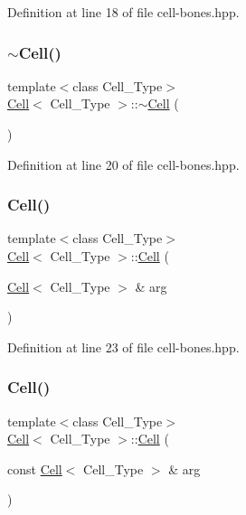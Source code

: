 Definition at line 18 of file cell-\/bones.\+hpp.

\mbox{\label{class_cell_a12667d768c7eab9e295b3476a5d60c0e}} 
\subsubsection{\texorpdfstring{$\sim$\+Cell()}{~Cell()}}
{\footnotesize\ttfamily template$<$class Cell\+\_\+\+Type$>$ \\
\hyperlink{class_cell}{Cell}$<$ Cell\+\_\+\+Type $>$\+::$\sim$\hyperlink{class_cell}{Cell} (\begin{DoxyParamCaption}{ }\end{DoxyParamCaption})\hspace{0.3cm}{\ttfamily [inline]}}



Definition at line 20 of file cell-\/bones.\+hpp.

\mbox{\label{class_cell_ac116d4235eadb134018324455a9bbdbf}} 
\subsubsection{\texorpdfstring{Cell()}{Cell()}\hspace{0.1cm}{\footnotesize\ttfamily [3/9]}}
{\footnotesize\ttfamily template$<$class Cell\+\_\+\+Type$>$ \\
\hyperlink{class_cell}{Cell}$<$ Cell\+\_\+\+Type $>$\+::\hyperlink{class_cell}{Cell} (\begin{DoxyParamCaption}\item[{\hyperlink{class_cell}{Cell}$<$ Cell\+\_\+\+Type $>$ \&}]{arg }\end{DoxyParamCaption})\hspace{0.3cm}{\ttfamily [inline]}}



Definition at line 23 of file cell-\/bones.\+hpp.

\mbox{\label{class_cell_ab745c6f11e7f43f06318b4bb733d9474}} 
\subsubsection{\texorpdfstring{Cell()}{Cell()}\hspace{0.1cm}{\footnotesize\ttfamily [4/9]}}
{\footnotesize\ttfamily template$<$class Cell\+\_\+\+Type$>$ \\
\hyperlink{class_cell}{Cell}$<$ Cell\+\_\+\+Type $>$\+::\hyperlink{class_cell}{Cell} (\begin{DoxyParamCaption}\item[{const \hyperlink{class_cell}{Cell}$<$ Cell\+\_\+\+Type $>$ \&}]{arg }\end{DoxyParamCaption})\hspace{0.3cm}{\ttfamily [inline]}}



